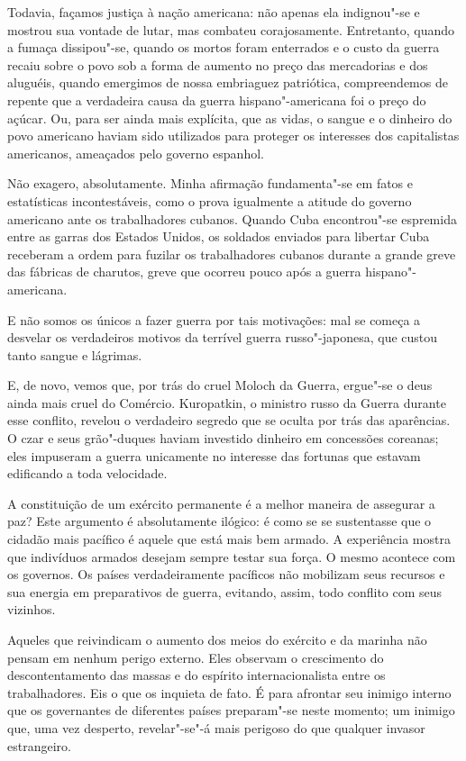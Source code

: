 Todavia, façamos justiça à nação americana: não apenas ela indignou"-se
e mostrou sua vontade de lutar, mas combateu corajosamente. Entretanto,
quando a fumaça dissipou"-se, quando os mortos foram enterrados e
o custo da guerra recaiu sobre o povo sob a forma de aumento no
preço das mercadorias e dos aluguéis, quando emergimos de nossa
embriaguez patriótica, compreendemos de repente que a verdadeira causa
da guerra hispano"-americana foi o preço do açúcar. Ou, para ser ainda
mais explícita, que as vidas, o sangue e o dinheiro do povo americano
haviam sido utilizados para proteger os interesses dos capitalistas
americanos, ameaçados pelo governo espanhol.

Não exagero, absolutamente. Minha afirmação fundamenta"-se em fatos e
estatísticas incontestáveis, como o prova igualmente a atitude do
governo americano ante os trabalhadores cubanos. Quando Cuba
encontrou"-se espremida entre as garras dos Estados Unidos, os
soldados enviados para libertar Cuba receberam a ordem para fuzilar os
trabalhadores cubanos durante a grande greve das fábricas de charutos,	
greve que ocorreu pouco após a guerra hispano"-americana.

E não somos os únicos a fazer guerra por tais motivações: mal se
começa a desvelar os verdadeiros motivos da terrível guerra
russo"-japonesa, que custou tanto sangue e lágrimas.

E, de novo, vemos que, por trás do cruel Moloch da Guerra, ergue"-se o
deus ainda mais cruel do Comércio. Kuropatkin, o ministro russo da
Guerra durante esse conflito, revelou o verdadeiro segredo que se
oculta por trás das aparências. O czar e seus grão"-duques haviam
investido dinheiro em concessões coreanas; eles impuseram a guerra
unicamente no interesse das fortunas que estavam edificando a toda
velocidade.

A constituição de um exército permanente é a melhor maneira de assegurar
a paz? Este argumento é absolutamente ilógico: é como se se sustentasse
que o cidadão mais pacífico é aquele que está mais bem armado. A
experiência mostra que indivíduos armados desejam sempre testar sua
força. O mesmo acontece com os governos. Os países verdadeiramente
pacíficos não mobilizam seus recursos e sua energia em preparativos de
guerra, evitando, assim, todo conflito com seus vizinhos.

Aqueles que reivindicam o aumento dos meios do exército e da marinha não
pensam em nenhum perigo externo. Eles observam o crescimento do
descontentamento das massas e do espírito internacionalista entre os
trabalhadores. Eis o que os inquieta de fato. É para afrontar seu
inimigo interno que os governantes de diferentes países preparam"-se
neste momento; um inimigo que, uma vez desperto, revelar"-se"-á mais
perigoso do que qualquer invasor estrangeiro.

